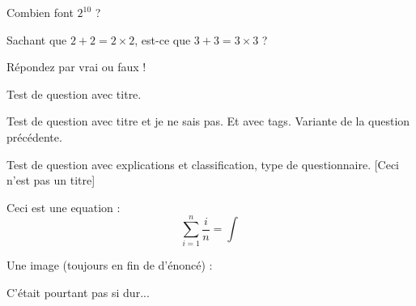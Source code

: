 

\begin{question}

Combien font \(2^{10}\) ?

\begin{answers}
\end{answers}
\end{question}


\begin{question}

Sachant que \(2+2=2\times 2\), 
est-ce que \(3+3 = 3\times 3\) ?

Répondez par vrai ou faux !

\begin{answers}
\end{answers}
\end{question}


\begin{question}

Test de question avec titre.

\begin{answers}
\end{answers}
\end{question}


\begin{question}
\qkeeporder
\qidontknow

Test de question avec titre et je ne sais pas. Et avec tags. Variante de la question précédente.

\begin{answers}
\end{answers}
\end{question}


\begin{question}
\qoneline

Test de question avec explications et classification, type de questionnaire. [Ceci n'est pas un titre]

Ceci est une equation :
\[\sum_{i=1}^n \frac{i}{n}=\int\]

Une image (toujours en fin de d'énoncé) : 


\begin{answers}
\end{answers}
\begin{explanations}
C'était pourtant pas si dur...
\end{explanations}
\end{question}
